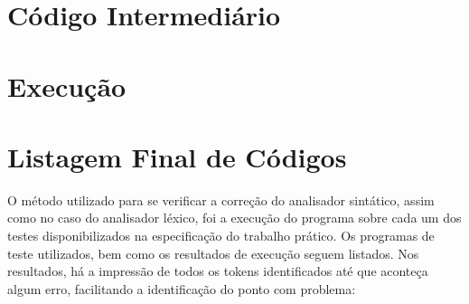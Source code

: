 \documentclass[12pt,a4paper]{article}
\begin{document}
\section{Código Intermediário}

\section{Execução}


\section{Listagem Final de Códigos} \label{listagem}



\medskip
O método utilizado para se verificar a correção do analisador sintático, assim como no caso do analisador léxico, foi a execução do programa sobre cada um dos testes disponibilizados na especificação do trabalho prático. Os programas de teste utilizados, bem como os resultados de execução seguem listados. Nos resultados, há a impressão de todos os tokens identificados até que aconteça algum erro, facilitando a identificação do ponto com problema:















\pagebreak



\end{document}
